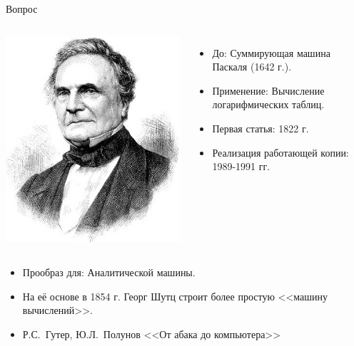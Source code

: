 \documentclass[pdf,9pt,aspectratio=169]{beamer}
\begin{document}
\begin{frame}{Вопрос}
\begin{columns}[c]
{\begin{column}[]{0.55\textwidth}
\begin{exampleblock}
\begin{columns}[]
            \includegraphics[width=\textwidth]{images/CharlesBabbage.jpg}
          \column{5.7cm}
              \setlength{\leftmargini}{5pt}
            \begin{itemize}
              \item До: Суммирующая машина Паскаля (1642 г.).
              \item Применение: Вычисление логарифмических таблиц.
              \item Первая статья: 1822 г.
              \item Реализация работающей копии: 1989-1991 гг.
            \end{itemize}
        \end{columns}
        \begin{itemize}
          \item Прообраз для: Аналитической машины.
          \item На её основе в 1854 г. Георг Шутц строит более простую <<машину вычислений>>.
          \item Р.С.~Гутер, Ю.Л.~Полунов <<От абака до компьютера>>
        \end{itemize}
      \end{exampleblock}
    \end{column}
}
  \end{columns}
\end{frame}
\end{document}

